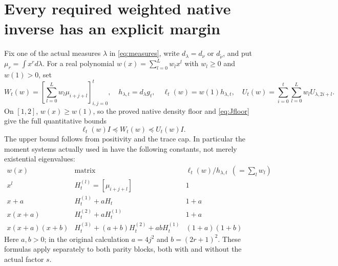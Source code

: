\documentclass[11pt]{article}
\begin{document}
\section{Every required weighted native inverse has an explicit margin}

Fix one of the actual measures $\lambda$ in \eqref{eq:measures},
write $d_\lambda=d_\nu$ or $d_{\widetilde\nu}$, and put
$\mu_r=\int x^r d\lambda$. For a real polynomial
$w(x)=\sum_{l=0}^Lw_lx^l$ with $w_l\ge0$ and $w(1)>0$, set
\begin{equation}\label{eq:W}
 W_t(w)=\left[\sum_{l=0}^Lw_l\mu_{i+j+l}\right]_{i,j=0}^t,
 \quad h_{\lambda,t}=d_\lambda g_t,
 \quad \ell_t(w)=w(1)h_{\lambda,t},\quad
 U_t(w)=\sum_{i=0}^t\sum_{l=0}^Lw_lU_{\lambda,2i+l}.
\end{equation}
On $[1,2]$, $w(x)\ge w(1)$, so the proved native density floor
and \eqref{eq:Jfloor} give the full quantitative bounds
\begin{equation}\label{eq:Wfloor}
 \boxed{\ell_t(w)I\preceq W_t(w)\preceq U_t(w)I.}
\end{equation}
The upper bound follows from positivity and the trace cap. In
particular the moment systems actually used in \cite{FM} have
the following constants, not merely existential eigenvalues:
\[
\begin{array}{c|c|c}
 w(x)&\text{matrix}&\ell_t(w)/h_{\lambda,t}\ \ (=\sum_lw_l)\\ \hline
 x^l&H_t^{(l)}=[\mu_{i+j+l}]&1\\
 x+a&H_t^{(1)}+aH_t&1+a\\
 x(x+a)&H_t^{(2)}+aH_t^{(1)}&1+a\\
 x(x+a)(x+b)&H_t^{(3)}+(a+b)H_t^{(2)}+abH_t^{(1)}&(1+a)(1+b)
\end{array}
\]
Here $a,b>0$; in the original calculation $a=4j^2$ and
$b=(2r+1)^2$. These formulas apply separately to both parity
blocks, both with and without the actual factor $s$.
\end{document}
